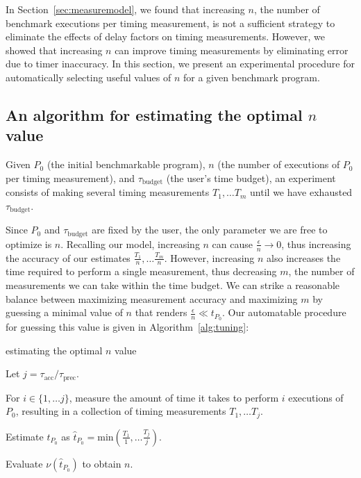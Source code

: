 \documentclass[conference]{IEEEtran}
\begin{document}
In Section~\ref{sec:measuremodel}, we found that increasing $n$, the number of benchmark
executions per timing measurement, is not a sufficient strategy to eliminate the effects of
delay factors on timing measurements. However, we showed that increasing $n$ can improve
timing measurements by eliminating error due to timer inaccuracy. In this section, we
present an experimental procedure for automatically selecting useful values of $n$ for
a given benchmark program.

\subsection{An algorithm for estimating the optimal $n$ value}

Given $P_0$ (the initial benchmarkable program), $n$ (the number of executions of $P_0$ per
timing measurement), and $\tau_{\textrm{budget}}$ (the user's time budget), an experiment
consists of making several timing measurements $T_1, \dots T_m$ until we have exhausted
$\tau_{\textrm{budget}}$.

Since $P_0$ and $\tau_{\textrm{budget}}$ are fixed by the user, the only parameter we are
free to optimize is $n$. Recalling our model, increasing $n$ can cause $\frac{\epsilon}{n}
\to 0$, thus increasing the accuracy of our estimates $\frac{T_1}{n}, \dots \frac{T_m}{n}$.
However, increasing $n$ also increases the time required to perform a single measurement,
thus decreasing $m$, the number of measurements we can take within the time budget. We can
strike a reasonable balance between maximizing measurement accuracy and maximizing $m$ by
guessing a minimal value of $n$ that renders $\frac{\epsilon}{n} \ll t_{P_0}$. Our
automatable procedure for guessing this value is given in Algorithm~\ref{alg:tuning}:

\begin{algorithm}
    \caption{estimating the optimal $n$ value}
    \label{alg:tuning}
    Let $j = \tau_{\textrm{acc}} / \tau_{\textrm{prec}}$.

    For $i \in \{1, \dots j\}$, measure the amount of time it takes to perform $i$
    executions of $P_0$, resulting in a collection of timing measurements $T_1, \dots T_j$.

    Estimate $t_{P_0}$ as $\hat{t}_{P_0} = \textrm{min}(\frac{T_1}{1}, \dots \frac{T_j}{j})$.

    Evaluate $\nu(\hat{t}_{P_0})$ to obtain $n$.
\end{algorithm}
\end{document}
